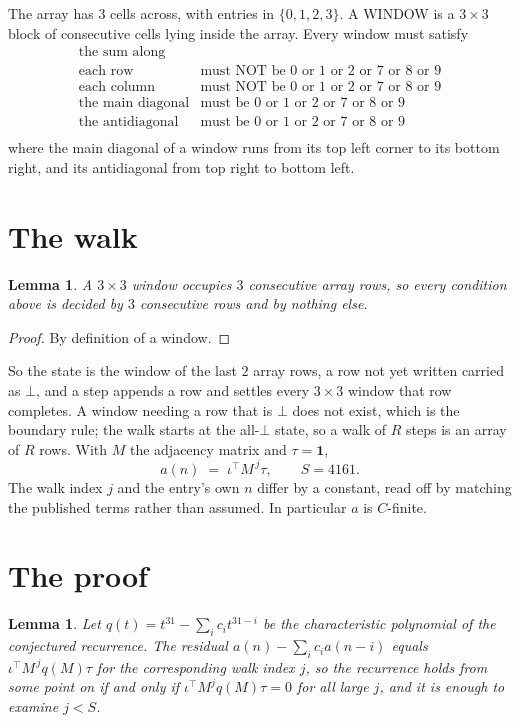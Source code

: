 \documentclass[11pt,a4paper]{article}
\theoremstyle{plain}
\newtheorem{lemma}[theorem]{Lemma}
\theoremstyle{definition}
\begin{document}
The array has $3$ cells across, with entries in $\{0,1,2,3\}$. A WINDOW is a $3\times3$ block
of consecutive cells lying inside the array. Every window must satisfy
\[
\begin{array}{ll}
\text{the sum along} & \text{} \\[2pt]
\text{each row} & \text{must NOT be 0 or 1 or 2 or 7 or 8 or 9} \\
\text{each column} & \text{must NOT be 0 or 1 or 2 or 7 or 8 or 9} \\
\text{the main diagonal} & \text{must be 0 or 1 or 2 or 7 or 8 or 9} \\
\text{the antidiagonal} & \text{must be 0 or 1 or 2 or 7 or 8 or 9} \\
\end{array}
\]
where the main diagonal of a window runs from its top left corner to its bottom right, and its
antidiagonal from top right to bottom left.

\section{The walk}

\begin{lemma}\label{lem:win}
A $3\times3$ window occupies $3$ consecutive array rows, so every condition above is
decided by $3$ consecutive rows and by nothing else.
\end{lemma}

\begin{proof}
By definition of a window.
\end{proof}

So the state is the window of the last $2$ array rows, a row not yet written carried as
$\bot$, and a step appends a row and settles every $3\times3$ window that row completes. A
window needing a row that is $\bot$ does not exist, which is the boundary rule; the walk starts
at the all-$\bot$ state, so a walk of $R$ steps is an array of $R$ rows. With $M$ the adjacency
matrix and $\tau=\mathbf{1}$,
\[
a(n)\;=\;\iota^{\!\top}M^{\,j}\tau ,\qquad S=4161.
\]
The walk index $j$ and the entry's own $n$ differ by a constant, read off by matching the
published terms rather than assumed. In particular $a$ is $C$-finite.

\section{The proof}

\begin{lemma}\label{lem:crit}
Let $q(t)=t^{31}-\sum_i c_it^{31-i}$ be the characteristic polynomial of the
conjectured recurrence. The residual $a(n)-\sum_ic_ia(n-i)$ equals
$\iota^{\!\top}M^{\,j}q(M)\tau$ for the corresponding walk index $j$, so the recurrence
holds from some point on if and only if $\iota^{\!\top}M^{j}q(M)\tau=0$ for all large $j$,
and it is enough to examine $j<S$.
\end{lemma}
\end{document}
